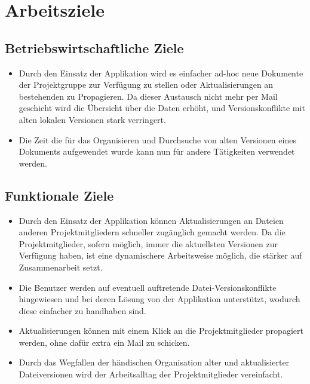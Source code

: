 
\section{Arbeitsziele}

\subsection{Betriebswirtschaftliche Ziele}
\begin{itemize}
\item Durch den Einsatz der Applikation wird es einfacher ad-hoc neue Dokumente der Projektgruppe zur Verfügung zu stellen oder Aktualisierungen an bestehenden zu Propagieren. Da dieser Austausch nicht mehr per Mail geschieht wird die Übersicht über die Daten erhöht, und Versionskonflikte mit alten lokalen Versionen stark verringert.

\item Die Zeit die für das Organisieren und Durchsuche von alten Versionen eines Dokuments aufgewendet wurde kann nun für andere Tätigkeiten verwendet werden.
\end{itemize}

\subsection{Funktionale Ziele}
\begin{itemize}
\item Durch den Einsatz der Applikation können Aktualisierungen an Dateien anderen Projektmitgliedern schneller zugänglich gemacht werden. Da die Projektmitglieder, sofern möglich, immer die aktuellsten Versionen zur Verfügung haben, ist eine dynamischere Arbeitsweise möglich, die stärker auf Zusammenarbeit setzt.

\item Die Benutzer werden auf eventuell auftretende Datei-Versionskonflikte hingewiesen und bei deren Lösung von der Applikation unterstützt, wodurch diese einfacher zu handhaben sind.

\item Aktualisierungen können mit einem Klick an die Projektmitglieder propagiert werden, ohne dafür extra ein Mail zu schicken.

\item Durch das Wegfallen der händischen Organisation alter und aktualisierter Dateiversionen wird der Arbeitsalltag der Projektmitglieder vereinfacht.
\end{itemize}

